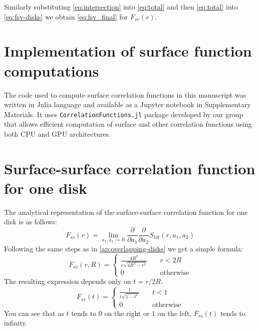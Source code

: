 \documentclass[reprint,amsmath,amssymb,aps,pre]{revtex4-1}
\newcommand{\code}[1]{\colorbox{light-gray}{\texttt{#1}}}
\begin{document}
Similarly substituting \cref{eq:intersection} into \cref{eq:total} and then
\cref{eq:total} into \cref{eq:fsv-disks} we obtain \cref{eq:fsv_final} for
$F_{sv}(r)$.

\section{Implementation of surface function computations}
The code used to compute surface correlation functions in this manuscript was
written in Julia language and available as a Jupyter notebook in Supplementary
Materials. It uses \code{CorrelationFunctions.jl} package developed by our group
\cite{CorrFunc.jl_paper} that allows efficient computation of surface and other
correlation functions using both CPU and GPU architectures.

\section{Surface-surface correlation function for one disk}
The analytical representation of the surface-surface correlation function for
one disk is as follows:
\begin{equation*}
  F_{ss}(r) = \lim_{a_1, a_2 \rightarrow R} \frac{\partial}{\partial a_1}
  \frac{\partial}{\partial a_2} S_{tot}(r, a_1, a_2)
\end{equation*}
Following the same steps as in \cref{ap:overlapping-disks} we get a simple
formula:
\begin{equation*}
  F_{ss}(r,R) = \left\{
  \begin{array}{ll}
    \frac{4R^2}{r\sqrt{4R^2-r^2}} & \quad r < 2R \\
    0 & \quad \text{otherwise}
  \end{array} \right.
\end{equation*}
The resulting expression depends only on $t = r / 2R$:
\begin{equation*}
  F_{ss}(t) = \left\{
  \begin{array}{ll}
    \frac{1}{t\sqrt{1-t^2}} & \quad t < 1 \\
    0 & \quad \text{otherwise}
  \end{array} \right.
\end{equation*}
You can see that as $t$ tends to $0$ on the right or $1$ on the left,
$F_{ss}(t)$ tends to infinity.

\onecolumngrid


\twocolumngrid
\end{document}
